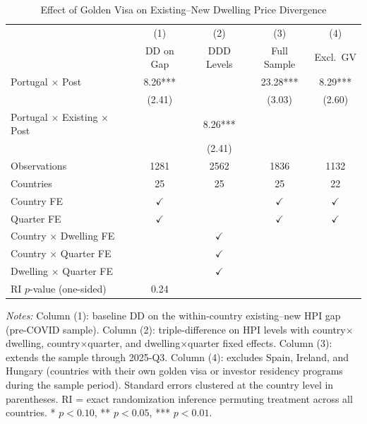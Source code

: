 \begin{table}[H]
\centering
\caption{Effect of Golden Visa on Existing--New Dwelling Price Divergence}
\label{tab:main}
\begin{threeparttable}
\begin{tabular}{lcccc}
\toprule
 & (1) & (2) & (3) & (4) \\
 & DD on Gap & DDD Levels & Full Sample & Excl.\ GV \\
\midrule
Portugal $\times$ Post & 8.26*** & & 23.28*** & 8.29*** \\
 & (2.41) & & (3.03) & (2.60) \\
Portugal $\times$ Existing $\times$ Post & & 8.26*** & & \\
 & & (2.41) & & \\
\midrule
Observations & 1281 & 2562 & 1836 & 1132 \\
Countries & 25 & 25 & 25 & 22 \\
Country FE & $\checkmark$ & & $\checkmark$ & $\checkmark$ \\
Quarter FE & $\checkmark$ & & $\checkmark$ & $\checkmark$ \\
Country $\times$ Dwelling FE & & $\checkmark$ & & \\
Country $\times$ Quarter FE & & $\checkmark$ & & \\
Dwelling $\times$ Quarter FE & & $\checkmark$ & & \\
RI $p$-value (one-sided) & 0.24 & & & \\
\bottomrule
\end{tabular}
\begin{tablenotes}[flushleft]
\small
\item \textit{Notes:} Column (1): baseline DD on the within-country existing--new HPI gap (pre-COVID sample). Column (2): triple-difference on HPI levels with country$\times$dwelling, country$\times$quarter, and dwelling$\times$quarter fixed effects. Column (3): extends the sample through 2025-Q3. Column (4): excludes Spain, Ireland, and Hungary (countries with their own golden visa or investor residency programs during the sample period). Standard errors clustered at the country level in parentheses. RI = exact randomization inference permuting treatment across all countries. * $p < 0.10$, ** $p < 0.05$, *** $p < 0.01$.
\end{tablenotes}
\end{threeparttable}
\end{table}

